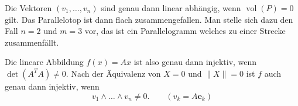 Die Vektoren $(v_1,\ldots,v_n)$ sind genau dann linear abhängig,
wenn $\operatorname{vol}(P)=0$ gilt. Das Parallelotop ist dann
flach zusammengefallen. Man stelle sich dazu den Fall $n=2$ und
$m=3$ vor, das ist ein Parallelogramm welches zu einer Strecke
zusammenfällt.

Die lineare Abbildung $f(x)=Ax$ ist also genau dann injektiv, wenn
$\det(A^T A)\ne 0$. Nach der Äquivalenz von $X=0$ und $\|X\|=0$ ist
$f$ auch genau dann injektiv, wenn
\begin{equation}
v_1\wedge\ldots\wedge v_n \ne 0.\qquad (v_k=A\mathbf e_k)
\end{equation}





